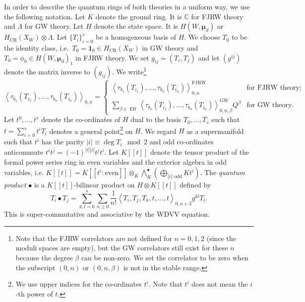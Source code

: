 \documentclass[11pt]{amsart}
\theoremstyle{definition} %
\theoremstyle{remark} %
\newcommand{\CC}{\mathbb C}
\def\GW{\operatorname{\text{GW}}}
\def\CR{\operatorname{\text{CR}}}
\def\corr#1{\left\langle #1 \right\rangle}
\newcommand{\bmu}{\boldsymbol{\mu}}
\newcommand{\unit}{\boldsymbol{1}}
\newcommand{\FJRW}{{\operatorname{FJRW}}}
\renewcommand{\GW}{{\operatorname{GW}}}
\renewcommand{\CR}{{\operatorname{CR}}}
\newcommand{\Eff}{\operatorname{Eff}}
\begin{document}
In order to describe the quantum rings of both 
theories in a uniform way, we use the following 
notation. Let $K$ denote the ground ring. It is 
$\CC$ for FJRW theory and $\Lambda$ for GW theory. 
Let $H$ denote the state space. It is $H(W,\bmu_d)$ 
or $H_{\CR}(X_W)\otimes \Lambda$. 
Let $\{T_i\}_{i=0}^s$ be a homogeneous basis of $H$. 
We choose $T_0$ to be the identity class, i.e.\ 
$T_0 = \unit_0 \in H_{\CR}(X_W)$ in GW theory 
and $T_0 = \phi_0\in H(W,\bmu_d)_1$ in FJRW theory. 
We set $g_{ij} = (T_i,T_j)$ and let 
$(g^{ij})$ denote the matrix inverse to $(g_{ij})$. 
We write\footnote
{Note that the FJRW correlators are not defined for $n=0,1,2$  
(since the moduli spaces are empty), but the GW 
correlators still exist for these $n$ because 
the degree $\beta$ can be non-zero. We set the correlator 
to be zero when the subscript $(0,n)$ or 
$(0,n,\beta)$ is not in the stable range.} 
\begin{equation} 
\label{eq:unified-correlatornotation} 
\corr{\tau_{b_1}(T_{i_1}),\dots,\tau_{b_n}(T_{i_n})}_{0,n} 
= \begin{cases} 
\corr{\tau_{b_1}(T_{i_1}),\dots,\tau_{b_n}(T_{i_n})
}^{\FJRW}_{0,n} & 
\text{for FJRW theory;} \\
\sum_{\beta\in \Eff} 
\corr{\tau_{b_1}(T_{i_1}),\dots,\tau_{b_n}(T_{i_n})
}^{\GW}_{0,n,\beta}  
Q^\beta
& \text{for GW theory}.  
\end{cases} 
\end{equation} 
Let $t^0,\dots,t^s$ denote the co-ordinates of $H$ 
dual to the basis $T_0,\dots,T_s$ such that 
$t = \sum_{i=0}^s t^i T_i$ denotes a general point\footnote
{We use upper indices for the co-ordinates $t^i$. 
Note that $t^i$ does not mean the $i$-th power of $t$.}
on $H$. 
We regard $H$ as a supermanifold such that 
$t^i$ has the parity $|i| \equiv \deg T_i \mod 2$ 
and odd co-ordinates anticommute $t^i t^j = (-1)^{|i||j|} t^j t^i$. 
Let $K[\![t]\!]$ denote the tensor product of the 
formal power series ring in even variables
and the exterior algebra in odd variables, i.e. 
$K[\![t]\!] = K[\![t^i:\text{even}]\!] \otimes_K 
\bigwedge^\bullet_K(\bigoplus_{|i|:\text{odd}} K t^i)$. 
The \emph{quantum product} $\bullet$ is a 
$K[\![t]\!]$-bilinear product 
on $H\otimes K[\![t]\!]$ defined by 
\begin{equation} 
\label{eq:quantum-prod} 
T_i \bullet T_j = \sum_{k,l=0}^s \sum_{n\ge 0} 
\frac{1}{n!} 
\corr{T_i, T_j,T_k, t,\dots,t}_{0,n+3} g^{kl} T_l. 
\end{equation} 
This is super-commutative and associative by the WDVV 
equation. 
\end{document}
